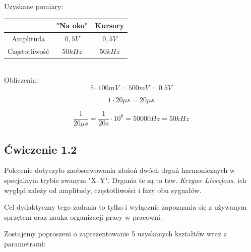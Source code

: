 \documentclass{article}
\begin{document}
        \pagebreak

        Uzyskane pomiary:\\

        \begin{tabular}{|c|c|c|}
          \hline
          & "{}Na oko"{} & Kursory \\
          \hline
          Amplituda & $0,5V$ & $0,5V$ \\
          \hline
          Częstotliwość & $50kHz$ & $50kHz$ \\
          \hline
        \end{tabular} \\

        Obliczenia:
        \begin{equation}
          5 \cdot 100mV = 500 mV = 0.5V
        \end{equation}

        \begin{equation}
          1 \cdot 20\mu s = 20 \mu s
        \end{equation}

        \begin{equation}
          \frac{1}{20\mu s} = \frac{1}{20s} \cdot 10^6 = 50 000 Hz = 50 kHz
        \end{equation}
        
    \subsection{Ćwiczenie 1.2}
      Polecenie dotyczyło zaobserwowania złożeń dwóch drgań harmonicznych w specjalnym trybie zwanym "X--Y". Drgania te są to tzw. \textit{Krzywe Lissajous}, ich wygląd zależy od amplitudy, częstotliwości i fazy obu sygnałów.

      Cel dydaktyczny tego zadania to tylko i wyłącznie zapoznania się z używanym sprzętem oraz nauka organizacji pracy w pracowni.

      Zostajemy poproszeni o zaprezentowanie 5 uzyskanych kształtów wraz z parametrami:

      \pagebreak
\end{document}
